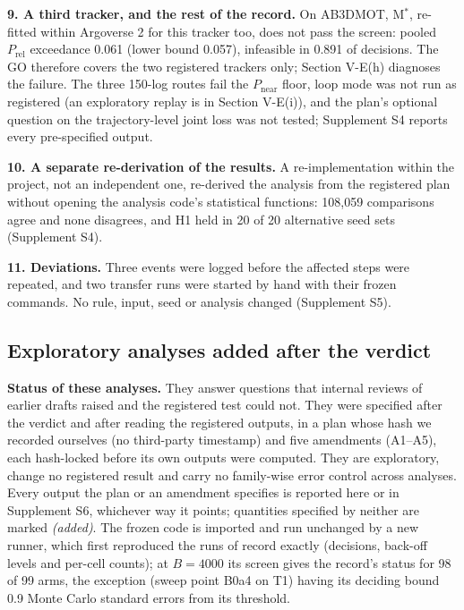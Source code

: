 \documentclass{ieeeaccess}
\begin{document}
\textbf{9. A third tracker, and the rest of the record.} On AB3DMOT, M$^{*}$, re-fitted within Argoverse 2 for this tracker too, does not pass the screen: pooled $P_{\mathrm{rel}}$ exceedance 0.061 (lower bound 0.057), infeasible in 0.891 of decisions. The GO therefore covers the two registered trackers only; Section V-E(h) diagnoses the failure. The three 150-log routes fail the $P_{\mathrm{near}}$ floor, loop mode was not run as registered (an exploratory replay is in Section V-E(i)), and the plan's optional question on the trajectory-level joint loss was not tested; Supplement S4 reports every pre-specified output.

\textbf{10. A separate re-derivation of the results.} A re-implementation within the project, not an independent one, re-derived the analysis from the registered plan without opening the analysis code's statistical functions: 108,059 comparisons agree and none disagrees, and H1 held in 20 of 20 alternative seed sets (Supplement S4).

\textbf{11. Deviations.} Three events were logged before the affected steps were repeated, and two transfer runs were started by hand with their frozen commands. No rule, input, seed or analysis changed (Supplement S5).

\subsection{Exploratory analyses added after the verdict}
\textbf{Status of these analyses.} They answer questions that internal reviews of earlier drafts raised and the registered test could not. They were specified after the verdict and after reading the registered outputs, in a plan whose hash we recorded ourselves (no third-party timestamp) and five amendments (A1--A5), each hash-locked before its own outputs were computed. They are exploratory, change no registered result and carry no family-wise error control across analyses. Every output the plan or an amendment specifies is reported here or in Supplement S6, whichever way it points; quantities specified by neither are marked \emph{(added)}. The frozen code is imported and run unchanged by a new runner, which first reproduced the runs of record exactly (decisions, back-off levels and per-cell counts); at $B = 4000$ its screen gives the record's status for 98 of 99 arms, the exception (sweep point B0a4 on T1) having its deciding bound 0.9 Monte Carlo standard errors from its threshold.
\end{document}
